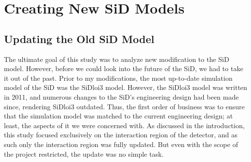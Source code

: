 \documentclass{report}
\begin{document}
    \chapter{Creating New SiD Models}
        \section{Updating the Old SiD Model}
            
            The ultimate goal of this study was to analyze new modification to the SiD model. However, before we could look into the future of the SiD, we had to take it out of the past. Prior to my modifications, the most up-to-date simulation model of the SiD was the SiDloi3 model. However, the SiDloi3 model was written in 2011, and numerous changes to the SiD's engineering design had been made since, rendering SiDloi3 outdated. Thus, the first order of business was to ensure that the simulation model was matched to the current engineering design; at least, the aspects of it we were concerned with. As discussed in the introduction, this study focused exclusively on the interaction region of the detector, and as such only the interaction region was fully updated. But even with the scope of the project restricted, the update was no simple task.
\end{document}
